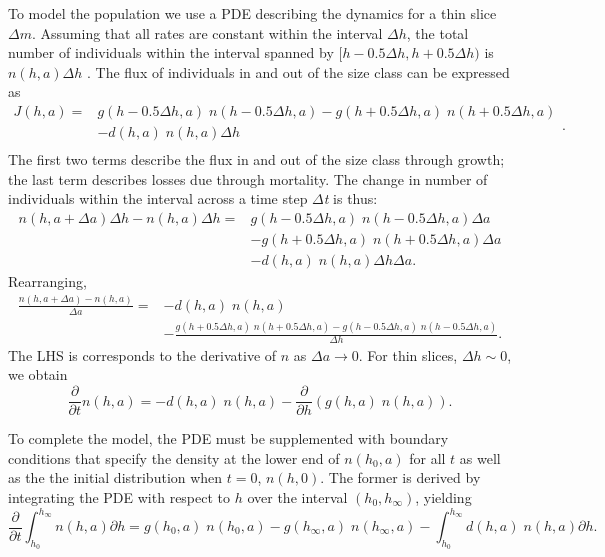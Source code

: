\documentclass[10pt,twoside]{article}
\begin{document}
To model the population we use a PDE describing the dynamics for a thin
slice \(\Delta m\). Assuming that all rates are constant within the
interval \(\Delta h\), the total number of individuals within the
interval spanned by \([h-0.5\Delta h,h+0.5\Delta h)\) is
\(n(h,a)\Delta h\) . The flux of individuals in and out of the size
class can be expressed as
\begin{equation}\begin{array}{ll} J(h,a)=&g(h-0.5 \Delta h,a) \; n(h-0.5 \Delta h,a)-g(h+0.5 \Delta h,a) \; n(h+0.5 \Delta h,a) \\ &-d (h,a) \; n(h,a)\Delta h\\ \end{array}.
\end{equation}
The first two terms describe the flux in and out of the size class
through growth; the last term describes losses due through mortality.
The change in number of individuals within the interval across a time
step \textit{$\Delta $t} is thus:
\begin{equation}
  \begin{array}{ll} n(h,a+\Delta a)\Delta h-n(h,a)\Delta h= &g(h-0.5 \Delta h,a) \; n(h-0.5 \Delta h,a)\Delta a \\ &-g(h+0.5 \Delta h,a) \; n(h+0.5 \Delta h,a)\Delta a\\&-d (h,a) \; n(h,a)\Delta h\Delta a.
  \end{array}
\end{equation}
Rearranging,
\begin{equation}
  \begin{array}{ll}
  \frac{n(h,a+\Delta a)-n(h,a)}{\Delta a} = &-d (h,a) \; n(h,a) \\
  &-\frac{g(h+0.5 \Delta h,a) \; n(h+0.5 \Delta h,a)-g(h-0.5 \Delta h,a) \; n(h-0.5 \Delta h,a)}{\Delta h}.
  \end{array}
\end{equation}
The LHS is corresponds to the derivative of \(n\) as \(\Delta a\to 0\).
For thin slices, \(\Delta h \sim 0\), we obtain
\begin{equation} \label{eq:PDE-app}
  \frac{\partial }{\partial t} n(h,a)=-d (h,a) \; n(h,a)-\frac{\partial }{\partial h} (g(h,a) \; n(h,a)).
\end{equation}

To complete the model, the PDE must be supplemented with boundary
conditions that specify the density at the lower end of \(n(h_{0},a)\)
for all \(t\) as well as the the initial distribution when \(t=0\),
\(n(h,0)\). The former is derived by integrating the PDE with respect to
\(h\) over the interval \((h_{0},h_{\infty })\), yielding
\begin{equation}\frac{\partial }{\partial t} \int _{h_{0} }^{h_{\infty } }n(h,a) \partial h=g(h_{0} ,a) \; n(h_{0} ,a)-g(h_{\infty } ,a) \; n(h_{\infty } ,a)-\int _{h_{0} }^{h_{\infty } }d (h,a) \; n(h,a) \partial h.
\end{equation}
\end{document}
